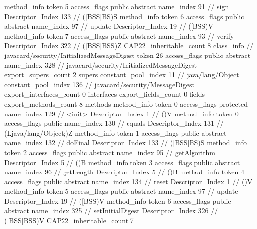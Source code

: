{{{{{				}
				method_info {
					token	5
					access_flags	public abstract
					name_index	91		// sign
					Descriptor_Index	133		// ([BSS[BS)S
				}
				method_info {
					token	6
					access_flags	public abstract
					name_index	97		// update
					Descriptor_Index	19		// ([BSS)V
				}
				method_info {
					token	7
					access_flags	public abstract
					name_index	93		// verify
					Descriptor_Index	322		// ([BSS[BSS)Z
				}
			}
			CAP22_inheritable_count	8
		}
		class_info {		// javacard/security/InitializedMessageDigest
			token	26
			access_flags	public abstract
			name_index	328		// javacard/security/InitializedMessageDigest
			export_supers_count	2
			supers {
				constant_pool_index	11		// java/lang/Object
				constant_pool_index	136		// javacard/security/MessageDigest
			}
			export_interfaces_count	0
			interfaces {
			}
			export_fields_count	0
			fields {
			}
			export_methods_count	8
			methods {
				method_info {
					token	0
					access_flags	protected
					name_index	129		// <init>
					Descriptor_Index	1		// ()V
				}
				method_info {
					token	0
					access_flags	public
					name_index	130		// equals
					Descriptor_Index	131		// (Ljava/lang/Object;)Z
				}
				method_info {
					token	1
					access_flags	public abstract
					name_index	132		// doFinal
					Descriptor_Index	133		// ([BSS[BS)S
				}
				method_info {
					token	2
					access_flags	public abstract
					name_index	95		// getAlgorithm
					Descriptor_Index	5		// ()B
				}
				method_info {
					token	3
					access_flags	public abstract
					name_index	96		// getLength
					Descriptor_Index	5		// ()B
				}
				method_info {
					token	4
					access_flags	public abstract
					name_index	134		// reset
					Descriptor_Index	1		// ()V
				}
				method_info {
					token	5
					access_flags	public abstract
					name_index	97		// update
					Descriptor_Index	19		// ([BSS)V
				}
				method_info {
					token	6
					access_flags	public abstract
					name_index	325		// setInitialDigest
					Descriptor_Index	326		// ([BSS[BSS)V
				}
			}
			CAP22_inheritable_count	7
		}
	}
}
